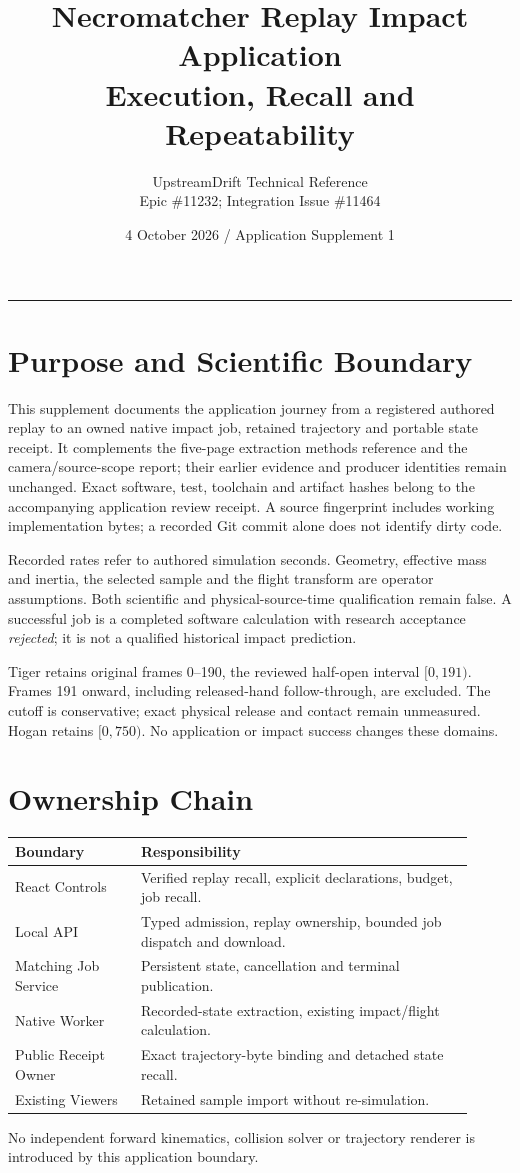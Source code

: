 \documentclass[11pt]{article}
\title{\textcolor{ink}{Necromatcher Replay Impact Application\\Execution, Recall and Repeatability}}
\author{UpstreamDrift Technical Reference\\Epic \#11232; Integration Issue \#11464}
\date{4 October 2026 / Application Supplement 1}
\begin{document}
\maketitle
\begin{center}\rule{0.9\linewidth}{0.6pt}\end{center}
\section*{Purpose and Scientific Boundary}
This supplement documents the application journey from a registered authored
replay to an owned native impact job, retained trajectory and portable state
receipt. It complements the five-page extraction methods reference and the
camera/source-scope report; their earlier evidence and producer identities remain
unchanged. Exact software, test, toolchain and artifact hashes belong to the
accompanying application review receipt. A source fingerprint includes working
implementation bytes; a recorded Git commit alone does not identify dirty code.

Recorded rates refer to authored simulation seconds. Geometry, effective mass
and inertia, the selected sample and the flight transform are operator
assumptions. Both scientific and physical-source-time qualification remain
false. A successful job is a completed software calculation with research
acceptance \emph{rejected}; it is not a qualified historical impact prediction.

Tiger retains original frames 0--190, the reviewed half-open interval $[0,191)$.
Frames 191 onward, including released-hand follow-through, are excluded. The
cutoff is conservative; exact physical release and contact remain unmeasured.
Hogan retains $[0,750)$. No application or impact success changes these domains.

\section*{Ownership Chain}
\begin{center}\small
\begin{tabular}{>{\raggedright\arraybackslash}p{0.25\linewidth}>{\raggedright\arraybackslash}p{0.66\linewidth}}\toprule
Boundary & Responsibility\\\midrule
React Controls & Verified replay recall, explicit declarations, budget, job recall.\\
Local API & Typed admission, replay ownership, bounded job dispatch and download.\\
Matching Job Service & Persistent state, cancellation and terminal publication.\\
Native Worker & Recorded-state extraction, existing impact/flight calculation.\\
Public Receipt Owner & Exact trajectory-byte binding and detached state recall.\\
Existing Viewers & Retained sample import without re-simulation.\\\bottomrule
\end{tabular}
\end{center}
No independent forward kinematics, collision solver or trajectory renderer is
introduced by this application boundary.
\end{document}

